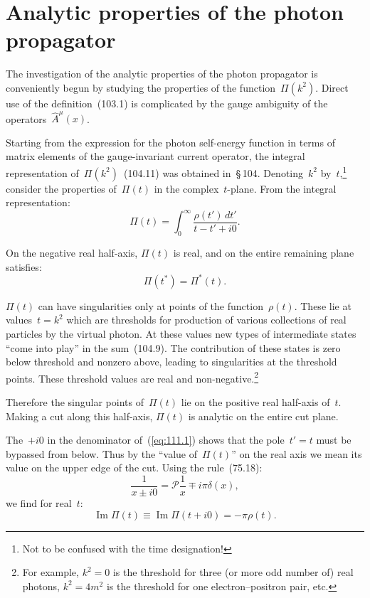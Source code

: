
\section{Analytic properties of the photon propagator}


The investigation of the analytic properties of the photon propagator is conveniently begun by studying the properties of the function~$\Pi(k^2)$. Direct use of the definition~(103.1) is complicated by the gauge ambiguity of the operators~$\hat{A}^\mu(x)$.

Starting from the expression for the photon self-energy function in terms of matrix elements of the gauge-invariant current operator, the integral representation of~$\Pi(k^2)$~(104.11) was obtained in~\S\,104. Denoting~$k^2$ by~$t$,\footnote{Not to be confused with the time designation!} consider the properties of~$\Pi(t)$ in the complex~$t$-plane. From the integral representation:
\begin{equation}
\Pi(t) = \int_0^\infty \frac{\rho(t')\,dt'}{t - t' + i0}.
\label{eq:111.1}
\end{equation}

On the negative real half-axis, $\Pi(t)$ is real, and on the entire remaining plane satisfies:
\begin{equation}
\Pi(t^*) = \Pi^*(t).
\label{eq:111.2}
\end{equation}

$\Pi(t)$ can have singularities only at points of the function~$\rho(t)$. These lie at values~$t = k^2$ which are thresholds for production of various collections of real particles by the virtual photon. At these values new types of intermediate states ``come into play'' in the sum~(104.9). The contribution of these states is zero below threshold and nonzero above, leading to singularities at the threshold points. These threshold values are real and non-negative.\footnote{For example, $k^2 = 0$ is the threshold for three (or more odd number of) real photons, $k^2 = 4m^2$ is the threshold for one electron--positron pair, etc.}


Therefore the singular points of~$\Pi(t)$ lie on the positive real half-axis of~$t$. Making a cut along this half-axis, $\Pi(t)$ is analytic on the entire cut plane.

The~$+i0$ in the denominator of~(\ref{eq:111.1}) shows that the pole~$t' = t$ must be bypassed from below. Thus by the ``value of~$\Pi(t)$'' on the real axis we mean its value on the upper edge of the cut. Using the rule~(75.18):
\begin{equation}
\frac{1}{x \pm i0} = \mathcal{P}\frac{1}{x} \mp i\pi\delta(x),
\label{eq:111.3}
\end{equation}
we find for real~$t$:
\begin{equation}
\operatorname{Im}\Pi(t) \equiv \operatorname{Im}\Pi(t + i0) = -\pi\rho(t).
\label{eq:111.4}
\end{equation}


